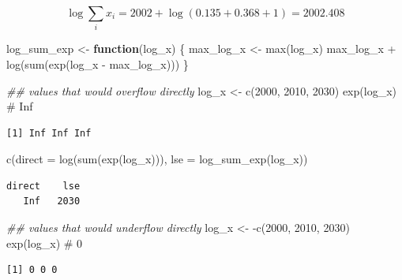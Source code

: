 \documentclass[
  letterpaper,
  DIV=11,
  numbers=noendperiod]{scrreprt}
\newenvironment{Shaded}{\begin{snugshade}}{\end{snugshade}}
\newcommand{\AttributeTok}[1]{\textcolor[rgb]{0.40,0.45,0.13}{#1}}
\newcommand{\CommentTok}[1]{\textcolor[rgb]{0.37,0.37,0.37}{#1}}
\newcommand{\ControlFlowTok}[1]{\textcolor[rgb]{0.00,0.23,0.31}{\textbf{#1}}}
\newcommand{\DecValTok}[1]{\textcolor[rgb]{0.68,0.00,0.00}{#1}}
\newcommand{\DocumentationTok}[1]{\textcolor[rgb]{0.37,0.37,0.37}{\textit{#1}}}
\newcommand{\FunctionTok}[1]{\textcolor[rgb]{0.28,0.35,0.67}{#1}}
\newcommand{\NormalTok}[1]{\textcolor[rgb]{0.00,0.23,0.31}{#1}}
\newcommand{\OtherTok}[1]{\textcolor[rgb]{0.00,0.23,0.31}{#1}}
\newcommand{\SpecialCharTok}[1]{\textcolor[rgb]{0.37,0.37,0.37}{#1}}
\begin{document}
\[
\log\sum_i x_i = 2002 + \log(0.135 + 0.368 + 1) = 2002.408
\]

\begin{Shaded}
\begin{Highlighting}[]
\NormalTok{log\_sum\_exp }\OtherTok{\textless{}{-}} \ControlFlowTok{function}\NormalTok{(log\_x) \{}
\NormalTok{  max\_log\_x }\OtherTok{\textless{}{-}} \FunctionTok{max}\NormalTok{(log\_x)}
\NormalTok{  max\_log\_x }\SpecialCharTok{+} \FunctionTok{log}\NormalTok{(}\FunctionTok{sum}\NormalTok{(}\FunctionTok{exp}\NormalTok{(log\_x }\SpecialCharTok{{-}}\NormalTok{ max\_log\_x)))}
\NormalTok{\}}

\DocumentationTok{\#\# values that would overflow directly}
\NormalTok{log\_x }\OtherTok{\textless{}{-}} \FunctionTok{c}\NormalTok{(}\DecValTok{2000}\NormalTok{, }\DecValTok{2010}\NormalTok{, }\DecValTok{2030}\NormalTok{)}
\FunctionTok{exp}\NormalTok{(log\_x)                                   }\CommentTok{\# Inf}
\end{Highlighting}
\end{Shaded}

\begin{verbatim}
[1] Inf Inf Inf
\end{verbatim}

\begin{Shaded}
\begin{Highlighting}[]
\FunctionTok{c}\NormalTok{(}\AttributeTok{direct =} \FunctionTok{log}\NormalTok{(}\FunctionTok{sum}\NormalTok{(}\FunctionTok{exp}\NormalTok{(log\_x))), }\AttributeTok{lse =} \FunctionTok{log\_sum\_exp}\NormalTok{(log\_x))}
\end{Highlighting}
\end{Shaded}

\begin{verbatim}
direct    lse 
   Inf   2030 
\end{verbatim}

\begin{Shaded}
\begin{Highlighting}[]
\DocumentationTok{\#\# values that would underflow directly}
\NormalTok{log\_x }\OtherTok{\textless{}{-}} \SpecialCharTok{{-}}\FunctionTok{c}\NormalTok{(}\DecValTok{2000}\NormalTok{, }\DecValTok{2010}\NormalTok{, }\DecValTok{2030}\NormalTok{)}
\FunctionTok{exp}\NormalTok{(log\_x)                                   }\CommentTok{\# 0}
\end{Highlighting}
\end{Shaded}

\begin{verbatim}
[1] 0 0 0
\end{verbatim}
\end{document}
